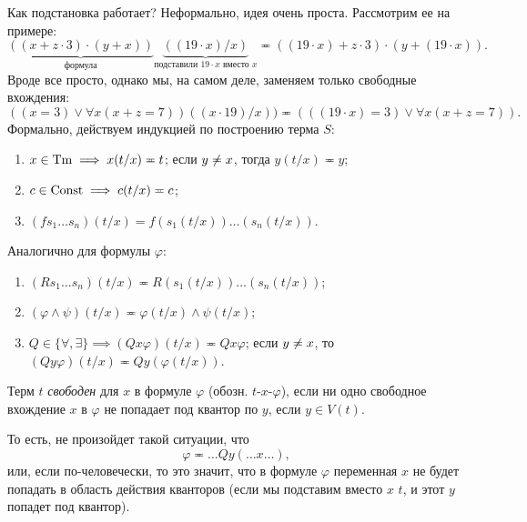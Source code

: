 Как подстановка работает?
Неформально, идея очень проста.
Рассмотрим ее на примере:
$$
    \underbrace{((x + z \cdot 3) \cdot (y + x))}_{\text{формула}}\underbrace{((19 \cdot x)/x)}_{\text{подставили } 19 \cdot x \text{ вместо } x} \eqcirc ((19 \cdot x) + z \cdot 3) \cdot (y + (19 \cdot x)).
$$
Вроде все просто, однако мы, на самом деле, заменяем только свободные вхождения:
$$
    ((x = 3) \lor \forall x (x + z = 7))((x \cdot 19) / x)) \eqcirc (((19 \cdot x) = 3) \lor \forall x (x + z = 7)).
$$
Формально, действуем индукцией по построению терма $S$:
\begin{enumerate}
    \item $x \in \mathrm{Tm} \implies x(t / x) \eqcirc t$; если $y \centernot \eqcirc x$, тогда $y(t/x) \eqcirc y$;
    \item $c \in \mathrm{Const} \implies c(t / x) \eqcirc c$;
    \item $(f s_{1} \ldots s_{n})(t / x) = f (s_{1}(t / x)) \ldots (s_{n}(t / x))$.
\end{enumerate}
Аналогично для формулы $\varphi$:
\begin{enumerate}
    \item $(R s_{1} \ldots s_{n})(t / x) \eqcirc R (s_{1}(t / x)) \ldots (s_{n}(t / x))$;
    \item $(\varphi \land \psi)(t / x) \eqcirc \varphi(t / x) \land \psi(t / x)$;
    \item $Q \in \{\forall, \exists\} \implies (Qx \varphi)(t / x) \eqcirc Qx \varphi$; если $y \centernot \eqcirc x$, то $(Qy \varphi)(t / x) \eqcirc Qy(\varphi(t / x))$.
\end{enumerate}

\begin{definition}
    Терм $t$ {\it свободен} для $x$ в формуле $\varphi$ (обозн. $t$-$x$-$\varphi$), если ни одно свободное вхождение $x$ в $\varphi$ не попадает под квантор по $y$, если $y \in V(t)$.
\end{definition}

То есть, не произойдет такой ситуации, что
$$
    \varphi \eqcirc \ldots Qy (\ldots x \ldots),
$$
или, если по-человечески, то это значит, что в формуле $\varphi$ переменная $x$ не будет попадать в область действия кванторов (если мы подставим вместо $x$ $t$, и этот $y$ попадет под квантор).

